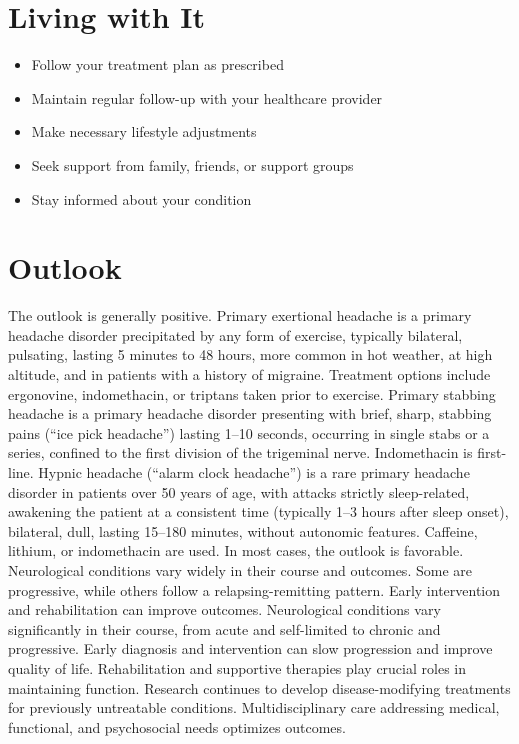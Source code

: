 \section{Living with It}
\begin{itemize}[noitemsep]
  \item Follow your treatment plan as prescribed
  \item Maintain regular follow-up with your healthcare provider
  \item Make necessary lifestyle adjustments
  \item Seek support from family, friends, or support groups
  \item Stay informed about your condition
\end{itemize}
\section{Outlook}
The outlook is generally positive. Primary exertional headache is a primary headache disorder precipitated by any form of exercise, typically bilateral, pulsating, lasting 5 minutes to 48 hours, more common in hot weather, at high altitude, and in patients with a history of migraine. Treatment options include ergonovine, indomethacin, or triptans taken prior to exercise. Primary stabbing headache is a primary headache disorder presenting with brief, sharp, stabbing pains (``ice pick headache'') lasting 1--10 seconds, occurring in single stabs or a series, confined to the first division of the trigeminal nerve. Indomethacin is first-line. Hypnic headache (``alarm clock headache'') is a rare primary headache disorder in patients over 50 years of age, with attacks strictly sleep-related, awakening the patient at a consistent time (typically 1--3 hours after sleep onset), bilateral, dull, lasting 15--180 minutes, without autonomic features. Caffeine, lithium, or indomethacin are used. In most cases, the outlook is favorable. Neurological conditions vary widely in their course and outcomes. Some are progressive, while others follow a relapsing-remitting pattern. Early intervention and rehabilitation can improve outcomes. Neurological conditions vary significantly in their course, from acute and self-limited to chronic and progressive. Early diagnosis and intervention can slow progression and improve quality of life. Rehabilitation and supportive therapies play crucial roles in maintaining function. Research continues to develop disease-modifying treatments for previously untreatable conditions. Multidisciplinary care addressing medical, functional, and psychosocial needs optimizes outcomes.
